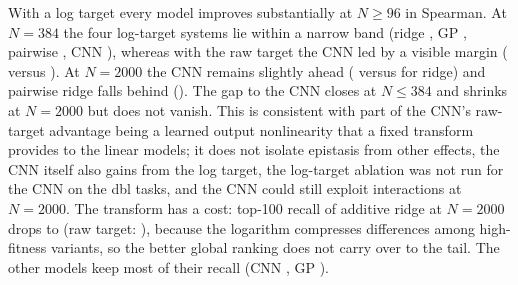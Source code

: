 With a log target every model improves substantially at $N\ge96$ in Spearman. At $N{=}384$ the four log-target systems lie within a narrow band (ridge , GP , pairwise , CNN ), whereas with the raw target the CNN led by a visible margin ( versus ). At $N{=}2000$ the CNN remains slightly ahead ( versus  for ridge) and pairwise ridge falls behind (). The gap to the CNN closes at $N\le384$ and shrinks at $N{=}2000$ but does not vanish. This is consistent with part of the CNN's raw-target advantage being a learned output nonlinearity that a fixed transform provides to the linear models; it does not isolate epistasis from other effects, the CNN itself also gains from the log target, the log-target ablation was not run for the CNN on the dbl tasks, and the CNN could still exploit interactions at $N{=}2000$.
The transform has a cost: top-100 recall of additive ridge at $N{=}2000$ drops to  (raw target: ), because the logarithm compresses differences among high-fitness variants, so the better global ranking does not carry over to the tail. The other models keep most of their recall (CNN , GP ).


